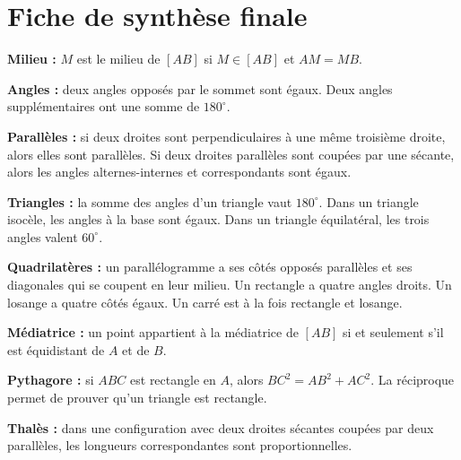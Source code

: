 \documentclass[11pt,a4paper]{article}
\begin{document}
\section{Fiche de synthèse finale}

\begin{retenirbox}
\textbf{Milieu :} $M$ est le milieu de $[AB]$ si $M\in[AB]$ et $AM=MB$.
\end{retenirbox}

\begin{retenirbox}
\textbf{Angles :} deux angles opposés par le sommet sont égaux. Deux angles supplémentaires ont une somme de $180^\circ$.
\end{retenirbox}

\begin{retenirbox}
\textbf{Parallèles :} si deux droites sont perpendiculaires à une même troisième droite, alors elles sont parallèles. Si deux droites parallèles sont coupées par une sécante, alors les angles alternes-internes et correspondants sont égaux.
\end{retenirbox}

\begin{retenirbox}
\textbf{Triangles :} la somme des angles d'un triangle vaut $180^\circ$. Dans un triangle isocèle, les angles à la base sont égaux. Dans un triangle équilatéral, les trois angles valent $60^\circ$.
\end{retenirbox}

\begin{retenirbox}
\textbf{Quadrilatères :} un parallélogramme a ses côtés opposés parallèles et ses diagonales qui se coupent en leur milieu. Un rectangle a quatre angles droits. Un losange a quatre côtés égaux. Un carré est à la fois rectangle et losange.
\end{retenirbox}

\begin{retenirbox}
\textbf{Médiatrice :} un point appartient à la médiatrice de $[AB]$ si et seulement s'il est équidistant de $A$ et de $B$.
\end{retenirbox}

\begin{retenirbox}
\textbf{Pythagore :} si $ABC$ est rectangle en $A$, alors $BC^2=AB^2+AC^2$. La réciproque permet de prouver qu'un triangle est rectangle.
\end{retenirbox}

\begin{retenirbox}
\textbf{Thalès :} dans une configuration avec deux droites sécantes coupées par deux parallèles, les longueurs correspondantes sont proportionnelles.
\end{retenirbox}
\end{document}
